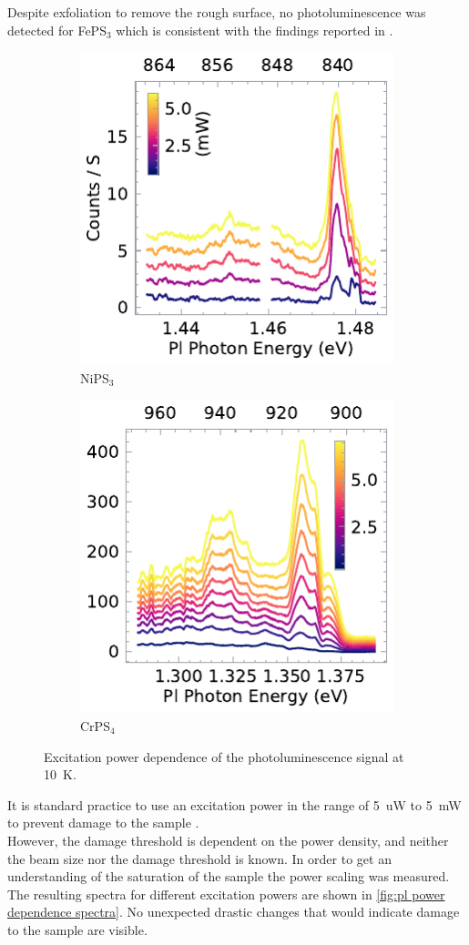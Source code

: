 \documentclass[
	oneside,
	parskip=half,
	a4paper,
]{scrbook}
\begin{document}
Despite exfoliation to remove the rough surface, no photoluminescence was detected for FePS$_3$ which is consistent with the findings reported in \cite{FePS3_pl}.

\begin{figure}
	\centering
	\begin{subfigure}{2.5in}
		\includegraphics{../figures/2024-04-06 NiPS3 excitation power dependence.pdf}
		\caption{NiPS$_3$}
	\end{subfigure}
	\begin{subfigure}{2.5in}
		\includegraphics{../figures/2023-12-14 CrPS4 excitation power dependence.pdf}
		\caption{CrPS$_4$}
	\end{subfigure}
	\caption{Excitation power dependence of the photoluminescence signal at \SI{10}{K}.}
	\label{fig:pl power dependence spectra}
\end{figure}
It is standard practice to use an excitation power in the range of \SI{5}{uW} to \SI{5}{mW} to prevent damage to the sample \cite{NiPS3_anisotropic, NiPS3_exciton}.\\
However, the damage threshold is dependent on the power density, and neither the beam size nor the damage threshold is known.
In order to get an understanding of the saturation of the sample the power scaling was measured.\\
The resulting spectra for different excitation powers are shown in \autoref{fig:pl power dependence spectra}.
No unexpected drastic changes that would indicate damage to the sample are visible.\\
\end{document}
